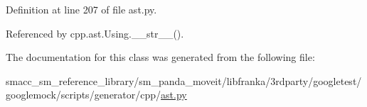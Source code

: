 Definition at line 207 of file ast.\+py.



Referenced by cpp.\+ast.\+Using.\+\_\+\+\_\+str\+\_\+\+\_\+().



The documentation for this class was generated from the following file\+:\begin{DoxyCompactItemize}
\item 
smacc\+\_\+sm\+\_\+reference\+\_\+library/sm\+\_\+panda\+\_\+moveit/libfranka/3rdparty/googletest/googlemock/scripts/generator/cpp/\hyperlink{ast_8py}{ast.\+py}\end{DoxyCompactItemize}
